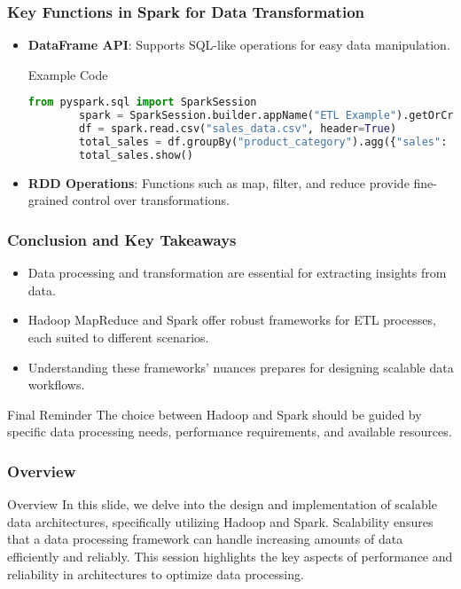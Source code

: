 \documentclass{beamer}
\begin{document}
\begin{frame}[fragile]
    \frametitle{Key Functions in Spark for Data Transformation}
    \begin{itemize}
        \item \textbf{DataFrame API}: Supports SQL-like operations for easy data manipulation.
        
        \begin{block}{Example Code}
        \begin{lstlisting}[language=Python]
        from pyspark.sql import SparkSession
        spark = SparkSession.builder.appName("ETL Example").getOrCreate()
        df = spark.read.csv("sales_data.csv", header=True)
        total_sales = df.groupBy("product_category").agg({"sales": "sum"})
        total_sales.show()
        \end{lstlisting}
        \end{block}
        
        \item \textbf{RDD Operations}: Functions such as map, filter, and reduce provide fine-grained control over transformations.
    \end{itemize}
\end{frame}

\begin{frame}[fragile]
    \frametitle{Conclusion and Key Takeaways}
    \begin{itemize}
        \item Data processing and transformation are essential for extracting insights from data.
        \item Hadoop MapReduce and Spark offer robust frameworks for ETL processes, each suited to different scenarios.
        \item Understanding these frameworks' nuances prepares for designing scalable data workflows.
    \end{itemize}
    \begin{block}{Final Reminder}
        The choice between Hadoop and Spark should be guided by specific data processing needs, performance requirements, and available resources.
    \end{block}
\end{frame}

\begin{frame}[fragile]
    \frametitle{Overview}
    \begin{block}{Overview}
        In this slide, we delve into the design and implementation of scalable data architectures, specifically utilizing Hadoop and Spark. Scalability ensures that a data processing framework can handle increasing amounts of data efficiently and reliably. This session highlights the key aspects of performance and reliability in architectures to optimize data processing.
    \end{block}
\end{frame}
\end{document}
